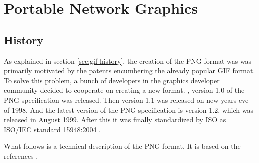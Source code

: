 \begin{comment}
  
\end{comment}






\chapter{Portable Network Graphics}
\label{cha:png}

\newcommand{\chnk}[1]{``#1''}

\newcommand{\IDAT}{\chnk{IDAT}\xspace}

\section{History}

As explained in section \ref{sec:gif-history}, the creation of the PNG
format was was primarily motivated by the patents encumbering the
already popular GIF format. To solve this problem, a bunch of
developers in the graphics developer community decided to cooperate on
creating a new format. , version 1.0 of the PNG
specification was released. Then version 1.1 was released on new years
eve of 1998. And the latest version of the PNG specification is
version 1.2, which was released in August 1999. After this it was
finally standardized by ISO as ISO/IEC standard 15948:2004
\cite{roelofs09:_histor_portab_networ_graph_png_format,roelofs99:_png,roelofs:_portab_networ_graph_main}.

What follows is a technical description of the PNG format. It is based
on the references
\cite{boutel:_png_portab_networ_graph_specif_version12,roelofs99:_png,boutel:_png_portab_networ_graph_specif_version11}.

\cite{sivonen:_sad_story_png_gamma_correc}

